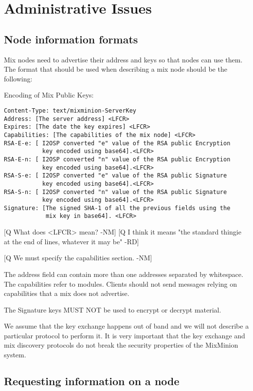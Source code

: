 \documentclass{article}
\begin{document}
\section{Administrative Issues}

\subsection{Node information formats}

Mix nodes need to advertise their address and keys so that nodes can
use them. The format that should be used when describing a mix node
should be the following:

Encoding of Mix Public Keys:

\begin{verbatim}
Content-Type: text/mixminion-ServerKey
Address: [The server address] <LFCR>
Expires: [The date the key expires] <LFCR>
Capabilities: [The capabilities of the mix node] <LFCR>
RSA-E-e: [ I2OSP converted "e" value of the RSA public Encryption 
           key encoded using base64].<LFCR>
RSA-E-n: [ I2OSP converted "n" value of the RSA public Encryption 
           key encoded using base64].<LFCR>
RSA-S-e: [ I2OSP converted "e" value of the RSA public Signature 
           key encoded using base64].<LFCR>
RSA-S-n: [ I2OSP converted "n" value of the RSA public Signature 
           key encoded using base64].<LFCR>
Signature: [The signed SHA-1 of all the previous fields using the 
            mix key in base64]. <LFCR>
\end{verbatim}

[Q What does <LFCR> mean? -NM]
 [Q I think it means "the standard thingie at the end of lines,
    whatever it may be" -RD]

[Q We must specify the capabilities section. -NM]

The address field can contain more than one addresses separated by
whitespace. The capabilities refer to modules. Clients should not 
send messages relying on capabilities that a mix does not advertise.

The Signature keys MUST NOT be used to encrypt or decrypt material.

We assume that the key exchange happens out of band and we will not
describe a particular protocol to perform it. It is very important
that the key exchange and mix discovery protocols do not break the
security properties of the MixMinion system.

\subsection{Requesting information on a node}
\end{document}
